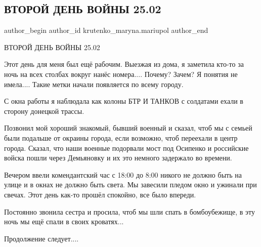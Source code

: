 
 
 
 
 

\subsection{ВТОРОЙ ДЕНЬ ВОЙНЫ 25.02}
\label{sec:25_02_2023.fb.krutenko_maryna.mariupol.1.vtoroj_den}

\ifcmt
 author_begin
   author_id krutenko_maryna.mariupol
 author_end
\fi

ВТОРОЙ ДЕНЬ ВОЙНЫ 25.02

Этот день для меня был ещё рабочим.  Выезжая из дома, я заметила кто-то за ночь
на всех столбах вокруг нанёс номера.... Почему? Зачем? Я понятия не имела.... Такие
метки начали появляется по всему городу.

С окна работы я наблюдала как колоны БТР И ТАНКОВ  с солдатами ехали в сторону
донецкой трассы. 

Позвонил мой хороший знакомый, бывший военный и сказал, чтоб мы с семьей были
подальше от окраины города, если возможно, чтоб переехали в центр города.
Сказал, что наши военные подорвали мост под Осипенко и российские войска пошли
через Демьяновку и их это немного задержало во времени. 

Вечером ввели комендантский час с 18:00 до 8:00 никого не должно быть на улице
и в окнах не должно быть света. Мы завесили пледом окно и ужинали при свечах.
Этот день как-то прошёл спокойно, все было впереди.

Постоянно звонила сестра и просила, чтоб мы шли спать в бомбоубежище, в эту
ночь мы ещё спали в своих кроватях...

Продолжение следует....

